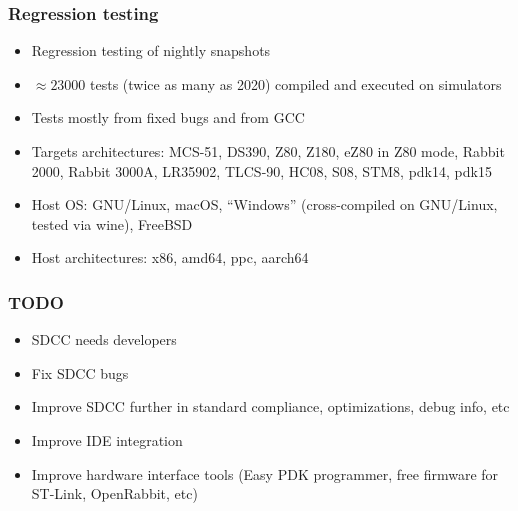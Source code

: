 \documentclass[xcolor=dvipsnames]{beamer}
\begin{document}
\begin{frame}
	\frametitle{Regression testing}
	\begin{itemize}
		\item Regression testing of nightly snapshots
		\item $\approx 23000$ tests (twice as many as 2020) compiled and executed on simulators
		\item Tests mostly from fixed bugs and from GCC
		\item Targets architectures: MCS-51, DS390, Z80, Z180, eZ80 in Z80 mode, Rabbit 2000, Rabbit 3000A, LR35902, TLCS-90, HC08, S08, STM8, pdk14, pdk15
		\item Host OS: GNU/Linux, macOS, ``Windows'' (cross-compiled on GNU/Linux, tested via wine), FreeBSD
		\item Host architectures: x86, amd64, ppc, aarch64
	\end{itemize}
\end{frame}

\begin{frame}
	\frametitle{TODO}
	\begin{itemize}
		\item SDCC needs developers
		\item Fix SDCC bugs
		\item Improve SDCC further in standard compliance, optimizations, debug info, etc
		\item Improve IDE integration
		\item Improve hardware interface tools (Easy PDK programmer, free firmware for ST-Link, OpenRabbit, etc)
	\end{itemize}
\end{frame}
\end{document}
